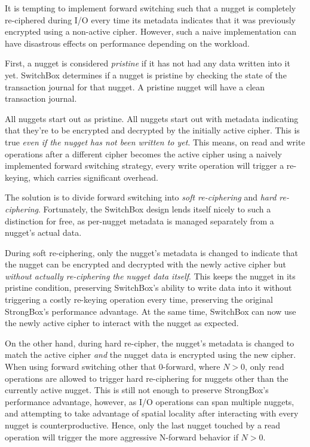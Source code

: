 It is tempting to implement forward switching such that a nugget is completely
re-ciphered during I/O every time its metadata indicates that it was previously
encrypted using a non-active cipher. However, such a naive implementation can
have disastrous effects on performance depending on the workload.

First, a nugget is considered \emph{pristine} if it has not had any data written
into it yet. SwitchBox determines if a nugget is pristine by checking the state
of the transaction journal for that nugget. A pristine nugget will have a clean
transaction journal.

All nuggets start out as pristine. All nuggets start out with metadata
indicating that they're to be encrypted and decrypted by the initially active
cipher. This is true \emph{even if the nugget has not been written to yet}. This
means, on read and write operations after a different cipher becomes the
active cipher using a naively implemented forward switching strategy, every
write operation will trigger a re-keying, which carries significant overhead.

The solution is to divide forward switching into \emph{soft re-ciphering} and
\emph{hard re-ciphering}. Fortunately, the SwitchBox design lends itself nicely
to such a distinction for free, as per-nugget metadata is managed separately
from a nugget's actual data.

During soft re-ciphering, only the nugget's metadata is changed to indicate that
the nugget can be encrypted and decrypted with the newly active cipher but
\emph{without actually re-ciphering the nugget data itself}. This keeps the
nugget in its pristine condition, preserving SwitchBox's ability to write data
into it without triggering a costly re-keying operation every time, preserving
the original StrongBox's performance advantage. At the same time, SwitchBox can
now use the newly active cipher to interact with the nugget as expected.

On the other hand, during hard re-cipher, the nugget's metadata is changed to
match the active cipher \emph{and} the nugget data is encrypted using the new
cipher. When using forward switching other that 0-forward,  where
$N > 0$, only read operations are allowed to trigger hard re-ciphering for
nuggets other than the currently active nugget. This is still not enough to
preserve StrongBox's performance advantage, however, as I/O operations can span
multiple nuggets, and attempting to take advantage of spatial locality after
interacting with every nugget is counterproductive. Hence, only the last nugget
touched by a read operation will trigger the more aggressive N-forward behavior
if $N > 0$.


